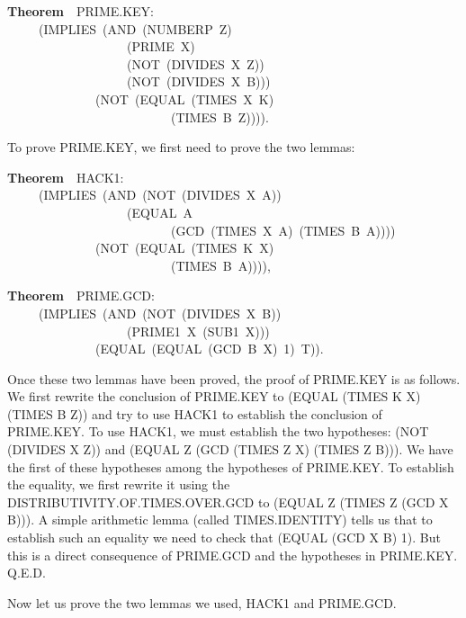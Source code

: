 \documentclass[10pt]{book}
\newenvironment{pubasis}{\begin{flushleft}}{\end{flushleft}}
\newcommand{\axiomordefinition}[1]{\vspace{6pt}\Large\textsf{\textbf{#1}}\normalsize}
\begin{document}
\begin{pubasis}
\axiomordefinition{Theorem}~~PRIME.KEY:\\
~~~~~(IMPLIES~(AND~(NUMBERP~Z)\\
~~~~~~~~~~~~~~~~~~~(PRIME~X)\\
~~~~~~~~~~~~~~~~~~~(NOT~(DIVIDES~X~Z))\\
~~~~~~~~~~~~~~~~~~~(NOT~(DIVIDES~X~B)))\\
~~~~~~~~~~~~~~(NOT~(EQUAL~(TIMES~X~K)\\
~~~~~~~~~~~~~~~~~~~~~~~~~~(TIMES~B~Z)))).\\
\end{pubasis}
To prove PRIME.KEY, we  first need to prove the
two lemmas:
\begin{pubasis}
\axiomordefinition{Theorem}~~HACK1:\\
~~~~~(IMPLIES~(AND~(NOT~(DIVIDES~X~A))\\
~~~~~~~~~~~~~~~~~~~(EQUAL~A\\
~~~~~~~~~~~~~~~~~~~~~~~~~~(GCD~(TIMES~X~A)~(TIMES~B~A))))\\
~~~~~~~~~~~~~~(NOT~(EQUAL~(TIMES~K~X)\\
~~~~~~~~~~~~~~~~~~~~~~~~~~(TIMES~B~A)))),\\
\end{pubasis}
\begin{pubasis}
\axiomordefinition{Theorem}~~PRIME.GCD:\\
~~~~~(IMPLIES~(AND~(NOT~(DIVIDES~X~B))\\
~~~~~~~~~~~~~~~~~~~(PRIME1~X~(SUB1~X)))\\
~~~~~~~~~~~~~~(EQUAL~(EQUAL~(GCD~B~X)~1)~T)).\\
\end{pubasis}
Once these two lemmas have been proved, the proof of
PRIME.KEY is as follows.
We first rewrite the conclusion of PRIME.KEY
to (EQUAL (TIMES K X) (TIMES B Z)) and try to use HACK1 to establish the conclusion
of PRIME.KEY.  To use HACK1, we must establish the two hypotheses:
(NOT (DIVIDES X Z)) and (EQUAL  Z (GCD (TIMES Z X) (TIMES Z B))).
We have the first of these hypotheses among the hypotheses of
PRIME.KEY.  To establish the equality, we first rewrite it
using the DISTRIBUTIVITY.OF.TIMES.OVER.GCD
to (EQUAL Z (TIMES Z (GCD X B))).  A simple arithmetic lemma
(called TIMES.IDENTITY) tells us that to establish such an equality
we need to check that (EQUAL (GCD X B) 1).  But this is a direct
consequence of PRIME.GCD and the hypotheses in PRIME.KEY. Q.E.D.

Now let us prove the two lemmas we used, HACK1 and PRIME.GCD.
\end{document}
